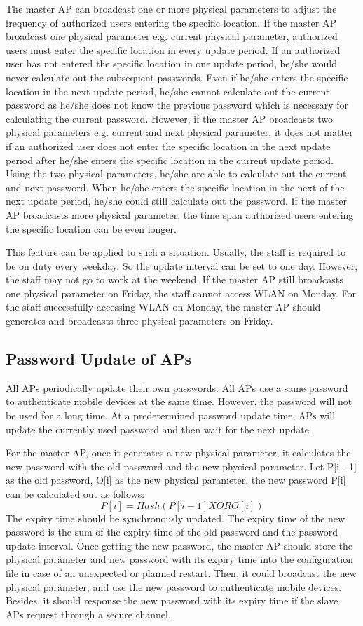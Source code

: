 The master AP can broadcast one or more physical parameters to adjust the frequency of authorized users entering the specific location. If the master AP broadcast one physical parameter e.g. current physical parameter, authorized users must enter the specific location in every update period. If an authorized user has not entered the specific location in one update period, he/she would never calculate out the subsequent passwords. Even if he/she enters the specific location in the next update period, he/she cannot calculate out the current password as he/she does not know the previous password which is necessary for calculating the current password. However, if the master AP broadcasts two physical parameters e.g. current and next physical parameter, it does not matter if an authorized user does not enter the specific location in the next update period after he/she enters the specific location in the current update period. Using the two physical parameters, he/she are able to calculate out the current and next password. When he/she enters the specific location in the next of the next update period, he/she could still calculate out the password. If the master AP broadcasts more physical parameter, the time span authorized users entering the specific location can be even longer. 

This feature can be applied to such a situation. Usually, the staff is required to be on duty every weekday. So the update interval can be set to one day. However, the staff may not go to work at the weekend. If the master AP still broadcasts one physical parameter on Friday, the staff cannot access WLAN on Monday. For the staff successfully accessing WLAN on Monday, the master AP should generates and broadcasts three physical parameters on Friday. 

\subsection{Password Update of APs}
All APs periodically update their own passwords. All APs use a same password to authenticate mobile devices at the same time. However, the password will not be used for a long time. At a predetermined password update time, APs will update the currently used password and then wait for the next update. 

For the master AP, once it generates a new physical parameter, it calculates the new password with the old password and the new physical parameter. Let P[i - 1] as the old password, O[i] as the new physical parameter, the new password P[i] can be calculated out as follows: $$P[i] = Hash(P[i - 1] XOR O[i])$$ The expiry time should be synchronously updated. The expiry time of the new password is the sum of the expiry time of the old password and the password update interval. Once getting the new password, the master AP should store the physical parameter and new password with its expiry time into the configuration file in case of an unexpected or planned restart. Then, it could broadcast the new physical parameter, and use the new password to authenticate mobile devices. Besides, it should response the new password with its expiry time if the slave APs request through a secure channel. 

